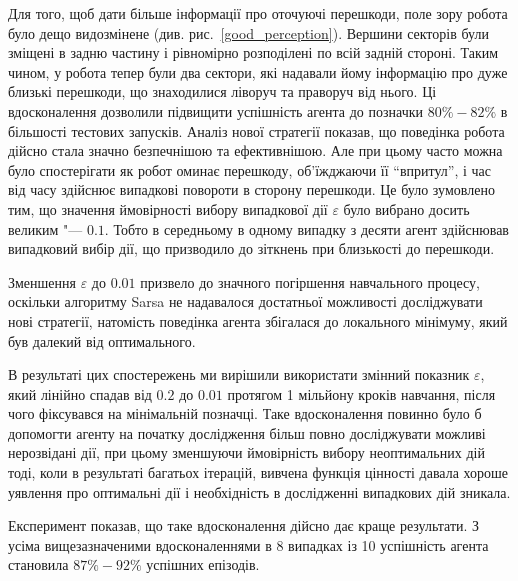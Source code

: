 \documentclass[a4paper,10pt,fleqn]{article}
\begin{document}
Для того, щоб дати більше інформації про оточуючі перешкоди, поле зору робота було дещо видозмінене (див. рис.~\ref{good_perception}). Вершини секторів були зміщені в задню частину і рівномірно розподілені по всій задній стороні. Таким чином, у робота тепер були два сектори, які надавали йому інформацію про дуже близькі перешкоди, що знаходилися ліворуч та праворуч від нього. Ці вдосконалення дозволили підвищити успішність агента до позначки $80\%-82\%$ в більшості тестових запусків. Аналіз нової стратегії показав, що поведінка робота дійсно стала значно безпечнішою та ефективнішою. Але при цьому часто можна було спостерігати як робот оминає перешкоду, об'їжджаючи її ``впритул'', і час від часу здійснює випадкові повороти в сторону перешкоди. Це було зумовлено тим, що значення ймовірності вибору випадкової дії $\varepsilon$ було вибрано досить великим "--- $0.1$. Тобто в середньому в одному випадку з десяти агент здійснював випадковий вибір дії, що призводило до зіткнень при близькості до перешкоди.

Зменшення $\varepsilon$ до $0.01$ призвело до значного погіршення навчального процесу, оскільки алгоритму Sarsa не надавалося достатньої можливості досліджувати нові стратегії, натомість поведінка агента збігалася до локального мінімуму, який був далекий від оптимального.

В результаті цих спостережень ми вирішили використати змінний показник $\varepsilon$, який лінійно спадав від $0.2$ до $0.01$ протягом 1 мільйону кроків навчання, після чого фіксувався на мінімальній позначці. Таке вдосконалення повинно було б допомогти агенту на початку дослідження більш повно досліджувати можливі нерозвідані дії, при цьому зменшуючи ймовірність вибору неоптимальних дій тоді, коли в результаті багатьох ітерацій, вивчена функція цінності давала хороше уявлення про оптимальні дії і необхідність в дослідженні випадкових дій зникала.

Експеримент показав, що таке вдосконалення дійсно дає краще результати. З усіма вищезазначеними вдосконаленнями в 8 випадках із 10 успішність агента становила $87\%-92\%$ успішних епізодів.
\end{document}
